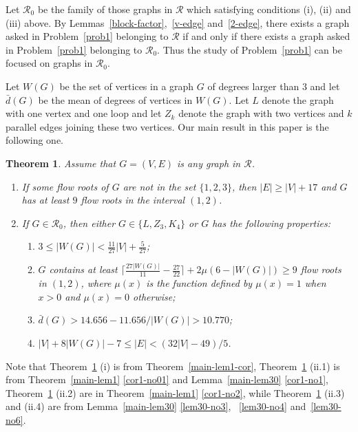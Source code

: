 \documentclass[11pt]{article}
\newtheorem{theo}{Theorem}
\newcommand {\red} {\textcolor{red}}
\renewcommand{\theenumi}{\rm (\roman{enumi})}
\def \setgr {\mathscr{R}}
\newcommand \nroot[1] 
{{\lceil \frac{27 #1}{11} -\frac{27}{22}\rceil+2\mu(6-#1)}}
\newcommand {\relabel}[1] {\label{#1} \red{[*: #1]}}\newcommand {\rebibitem}[1] {\bibitem{#1} \red{[*: #1]}}%
\def\relabel {\label} \def\rebibitem {\bibitem}  %
\begin{document}
Let $\setgr_0$ be the family of those graphs in $\setgr$  
which satisfying conditions (i), (ii) and (iii) above.
By Lemmas~\ref{block-factor},~\ref{v-edge} and~\ref{2-edge},
there exists a graph asked in Problem~\ref{prob1}
belonging to $\setgr$ 
if and only if there exists a graph 
asked in Problem~\ref{prob1} belonging to $\setgr_0$.
Thus the study of Problem~\ref{prob1} can be focused on 
graphs in $\setgr_0$. 

Let $W(G)$ be the set of vertices in a graph $G$ 
of degrees larger than $3$
and let $\bar d(G)$ be the mean 
of degrees of vertices in $W(G)$.
Let $L$ denote the graph with one vertex and one loop
and 
let $Z_k$ denote the graph with two vertices 
and $k$ parallel edges joining these two vertices. 
Our main result in this paper is the following one. 



\begin{theo}\relabel{main-th}
Assume that $G=(V,E)$ is any graph in $\setgr$.
\begin{enumerate}
\item
If some flow roots of $G$ are not in the set $\{1,2,3\}$, 
then $|E|\ge |V|+17$ and 
$G$ has at least $9$ flow roots in the interval $(1,2)$.
\item If $G\in \setgr_0$,
then either $G\in \{L, Z_3,K_4\}$
or $G$ has the following properties: 
\begin{enumerate}
\renewcommand{\theenumi}{\roman{enumi}}
\renewcommand{\theenumii}{\rm \theenumi.\arabic{enumii}}
\item\relabel{no1} 
$3\le |W(G)|< \frac {11}{27}|V|+\frac 5{27}$; 
\item\relabel{no2} $G$ contains at least 
$\nroot{|W(G)|}\ge 9$
flow roots in $(1,2)$,
where $\mu(x)$ is the function defined by $\mu(x)=1$ when $x>0$ 
and $\mu(x)=0$ otherwise;

\item\relabel{no3} $\bar d(G)> 14.656-11.656/|W(G)|>10.770$;
\item\relabel{no4} $|V|+8|W(G)|-7\le |E|<(32|V|-49)/5$. 
\end{enumerate}
\end{enumerate}
\end{theo}


Note that 
Theorem~\ref{main-th} (i) is from 
Theorem~\ref{main-lem1-cor}, 
Theorem~\ref{main-th} (ii.1)
is from Theorem~\ref{main-lem1} \ref{cor1-no01} and
Lemma~\ref{main-lem30} \ref{cor1-no1},
Theorem~\ref{main-th} (ii.2) 
are in Theorem~\ref{main-lem1} \ref{cor1-no2},
while Theorem~\ref{main-th} (ii.3) and (ii.4) are from 
Lemma~\ref{main-lem30} \ref{lem30-no3}, ~\ref{lem30-no4}
and~\ref{lem30-no6}.
\end{document}
